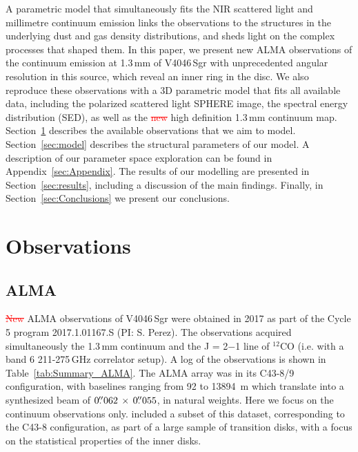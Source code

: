 \documentclass[fleqn,usenatbib,useAMS]{mnras}
\newcommand{\red}[1]{\textcolor{red}{#1}}
\begin{document}
A parametric model that simultaneously fits the NIR scattered light and millimetre continuum emission links the observations to the structures in the underlying dust and gas density distributions, and sheds light on the complex processes that shaped them. In this paper, we present new ALMA observations of the continuum emission at 1.3\,mm of V4046\,Sgr with unprecedented angular resolution in this source, which reveal an inner ring in the disc. We also reproduce these observations with a 3D parametric model that fits all available data, including the polarized scattered light SPHERE image, the spectral energy distribution (SED), as well as the \red{\sout{new}} high definition 1.3\,mm continuum map. Section~\ref{sec:Observations} describes the available observations that we aim to model. Section~\ref{sec:model} describes the structural parameters of our model. A description of our parameter space exploration can be found in Appendix~\ref{sec:Appendix}. The results of our modelling are presented in Section~\ref{sec:results}, including a discussion of the main findings. Finally, in Section~\ref{sec:Conclusions} we present our conclusions.

\section{Observations} \label{sec:Observations}
\subsection{ALMA}  \label{subsec:ALMA}

\red{\sout{New}} ALMA observations of V4046\,Sgr were obtained in 2017 as part of the Cycle 5 program 2017.1.01167.S (PI: S. Perez). The observations acquired simultaneously the 1.3\,mm continuum and the J = 2$-$1 line of $^{12}$CO (i.e. with a band 6 211-275\,GHz correlator setup). A log of the observations is shown in Table~\ref{tab:Summary_ALMA}. The ALMA array was in its C43-8/9 configuration, with baselines ranging from 92 to 13894 \,m which translate into a synthesized beam of $0\hbox{$.\!\!^{\prime\prime}$}062 \,\times \, 0\hbox{$.\!\!^{\prime\prime}$}055$, in natural weights. Here we focus on the continuum observations only. \citet{Francis_2020} included a subset of this dataset, corresponding to the C43-8 configuration, as part of a large sample of transition disks, with a focus on the statistical properties of the inner disks.
\end{document}

